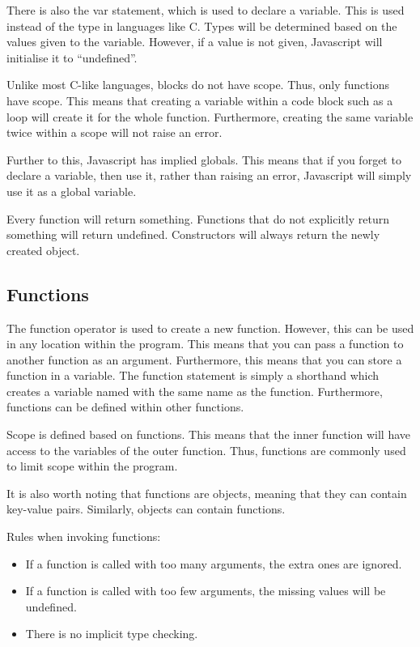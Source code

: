 			There is also the var statement, which is used to declare a variable. 
			This is used instead of the type in languages like C. 
			Types will be determined based on the values given to the variable.
			However, if a value is not given, Javascript will initialise it to ``undefined''. 

			Unlike most C-like languages, blocks do not have scope. 
			Thus, only functions have scope. 
			This means that creating a variable within a code block such as a loop will create it for the whole function. 
			Furthermore, creating the same variable twice within a scope will not raise an error. 

			Further to this, Javascript has implied globals. 
			This means that if you forget to declare a variable, then use it, 
			rather than raising an error, Javascript will simply use it as a global variable. 

			Every function will return something. 
			Functions that do not explicitly return something will return undefined. 
			Constructors will always return the newly created object. 

		\subsection{Functions}
			The function operator is used to create a new function. 
			However, this can be used in any location within the program. 
			This means that you can pass a function to another function as an argument. 
			Furthermore, this means that you can store a function in a variable.
			The function statement is simply a shorthand which creates a variable named with the same name as the function. 
			Furthermore, functions can be defined within other functions. 

			Scope is defined based on functions. 
			This means that the inner function will have access to the variables of the outer function. 
			Thus, functions are commonly used to limit scope within the program. 

			It is also worth noting that functions are objects, meaning that they can contain key-value pairs. 
			Similarly, objects can contain functions. 

			Rules when invoking functions:
			\begin{itemize}
				\item If a function is called with too many arguments, the extra ones are ignored. 
				\item If a function is called with too few arguments, the missing values will be undefined. 
				\item There is no implicit type checking. 
			\end{itemize}
			
